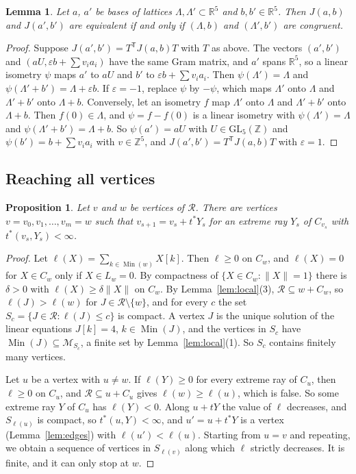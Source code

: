 \documentclass[11pt]{amsart}
\newtheorem{proposition}[theorem]{Proposition}
\newtheorem{lemma}[theorem]{Lemma}
\theoremstyle{definition}
\theoremstyle{remark}
\numberwithin{equation}{section}
\numberwithin{table}{section}
\numberwithin{figure}{section}
\newcommand{\R}{\mathbb{R}}
\newcommand{\Z}{\mathbb{Z}}
\newcommand{\M}{\mathcal{M}}
\newcommand{\Rk}{\mathcal{R}}
\newcommand{\Min}{\operatorname{Min}}
\newcommand{\GL}{\mathrm{GL}}
\newcommand{\T}{\mathsf{T}}
\begin{document}
\begin{lemma}\label{lem:congruent}
Let $a$, $a'$ be bases of lattices $\Lambda,\Lambda'\subset\R^5$ and $b,b'\in\R^5$. Then $J(a,b)$ and $J(a',b')$ are equivalent if and only if $(\Lambda,b)$ and $(\Lambda',b')$ are congruent.
\end{lemma}

\begin{proof}
Suppose $J(a',b')=T^\T J(a,b)T$ with $T$ as above. The vectors $(a',b')$ and $(aU,\varepsilon b+\sum v_ia_i)$ have the same Gram matrix, and $a'$ spans $\R^5$, so a linear isometry $\psi$ maps $a'$ to $aU$ and $b'$ to $\varepsilon b+\sum v_ia_i$. Then $\psi(\Lambda')=\Lambda$ and $\psi(\Lambda'+b')=\Lambda+\varepsilon b$. If $\varepsilon=-1$, replace $\psi$ by $-\psi$, which maps $\Lambda'$ onto $\Lambda$ and $\Lambda'+b'$ onto $\Lambda+b$. Conversely, let an isometry $f$ map $\Lambda'$ onto $\Lambda$ and $\Lambda'+b'$ onto $\Lambda+b$. Then $f(0)\in\Lambda$, and $\psi=f-f(0)$ is a linear isometry with $\psi(\Lambda')=\Lambda$ and $\psi(\Lambda'+b')=\Lambda+b$. So $\psi(a')=aU$ with $U\in\GL_5(\Z)$ and $\psi(b')=b+\sum v_ia_i$ with $v\in\Z^5$, and $J(a',b')=T^\T J(a,b)T$ with $\varepsilon=1$.
\end{proof}

\subsection{Reaching all vertices}

\begin{proposition}\label{prop:connected}
Let $v$ and $w$ be vertices of $\Rk$. There are vertices $v=v_0,v_1,\dots,v_m=w$ such that $v_{s+1}=v_s+t^*Y_s$ for an extreme ray $Y_s$ of $C_{v_s}$ with $t^*(v_s,Y_s)<\infty$.
\end{proposition}

\begin{proof}
Let $\ell(X)=\sum_{k\in\Min(w)}X[k]$. Then $\ell\ge0$ on $C_w$, and $\ell(X)=0$ for $X\in C_w$ only if $X\in L_w=0$. By compactness of $\{X\in C_w:\|X\|=1\}$ there is $\delta>0$ with $\ell(X)\ge\delta\|X\|$ on $C_w$. By Lemma~\ref{lem:local}(3), $\Rk\subseteq w+C_w$, so $\ell(J)>\ell(w)$ for $J\in\Rk\setminus\{w\}$, and for every $c$ the set $S_c=\{J\in\Rk:\ell(J)\le c\}$ is compact. A vertex $J$ is the unique solution of the linear equations $J[k]=4$, $k\in\Min(J)$, and the vertices in $S_c$ have $\Min(J)\subseteq\M_{S_c}$, a finite set by Lemma~\ref{lem:local}(1). So $S_c$ contains finitely many vertices.

Let $u$ be a vertex with $u\ne w$. If $\ell(Y)\ge0$ for every extreme ray of $C_u$, then $\ell\ge0$ on $C_u$, and $\Rk\subseteq u+C_u$ gives $\ell(w)\ge\ell(u)$, which is false. So some extreme ray $Y$ of $C_u$ has $\ell(Y)<0$. Along $u+tY$ the value of $\ell$ decreases, and $S_{\ell(u)}$ is compact, so $t^*(u,Y)<\infty$, and $u'=u+t^*Y$ is a vertex (Lemma~\ref{lem:edges}) with $\ell(u')<\ell(u)$. Starting from $u=v$ and repeating, we obtain a sequence of vertices in $S_{\ell(v)}$ along which $\ell$ strictly decreases. It is finite, and it can only stop at $w$.
\end{proof}
\end{document}
